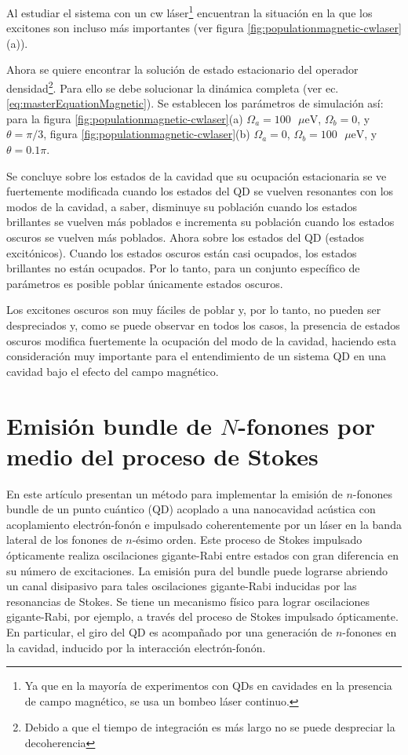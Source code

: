 \documentclass[main.tex]{subfiles}
\begin{document}
Al estudiar el sistema con un cw láser\footnote{Ya que en la mayoría de experimentos con QDs en cavidades en la presencia de campo magnético, se usa un bombeo láser continuo.} encuentran la situación en la que los excitones son incluso más importantes (ver figura \ref{fig:populationmagnetic-cwlaser}(a)).

Ahora se quiere encontrar la solución de estado estacionario del operador densidad\footnote{Debido a que el tiempo de integración es más largo no se puede despreciar la decoherencia}. Para ello se debe solucionar la dinámica completa (ver ec. \ref{eq:masterEquationMagnetic}). Se establecen los parámetros de simulación así: para la figura \ref{fig:populationmagnetic-cwlaser}(a) $\Omega_a = 100\text{ $\mu$eV}$, $\Omega_b = 0$, y $\theta = \pi/3$, figura \ref{fig:populationmagnetic-cwlaser}(b) $\Omega_a = 0$, $\Omega_b = 100\text{ $\mu$eV}$, y $\theta = 0.1\pi$. 

Se concluye sobre los estados de la cavidad que su ocupación estacionaria se ve fuertemente modificada cuando los estados del QD se vuelven resonantes con los modos de la cavidad, a saber, disminuye su población cuando los estados brillantes se vuelven más poblados e incrementa su población cuando los estados oscuros se vuelven más poblados. Ahora sobre los estados del QD (estados excitónicos). Cuando los estados oscuros están casi ocupados, los estados brillantes no están ocupados. Por lo tanto, para un conjunto específico de parámetros es posible poblar únicamente estados oscuros.

Los excitones oscuros son muy fáciles de poblar y, por lo tanto, no pueden ser despreciados y, como se puede observar en todos los casos, la presencia de estados oscuros modifica fuertemente la ocupación del modo de la cavidad, haciendo esta consideración muy importante para el entendimiento de un sistema QD en una cavidad bajo el efecto del campo magnético.

\section{Emisión bundle de $N$-fonones por medio del proceso de Stokes}\label{sec:StokesBundles}

En este artículo \parencite{Bin2020} presentan un método para implementar la emisión de $n$-fonones bundle de un punto cuántico (QD) acoplado a una nanocavidad acústica con acoplamiento electrón-fonón e impulsado coherentemente por un láser en la banda lateral de los fonones de $n$-ésimo orden. Este proceso de Stokes impulsado ópticamente realiza oscilaciones gigante-Rabi \parencite{Strekalov2014} entre estados con gran diferencia en su número de excitaciones. La emisión pura del bundle puede lograrse abriendo un canal disipasivo para tales oscilaciones gigante-Rabi inducidas por las resonancias de Stokes. Se tiene un mecanismo físico para lograr oscilaciones gigante-Rabi, por ejemplo, a través del proceso de Stokes impulsado ópticamente. En particular, el giro del QD es acompañado por una generación de $n$-fonones en la cavidad, inducido por la interacción electrón-fonón.
\end{document}
